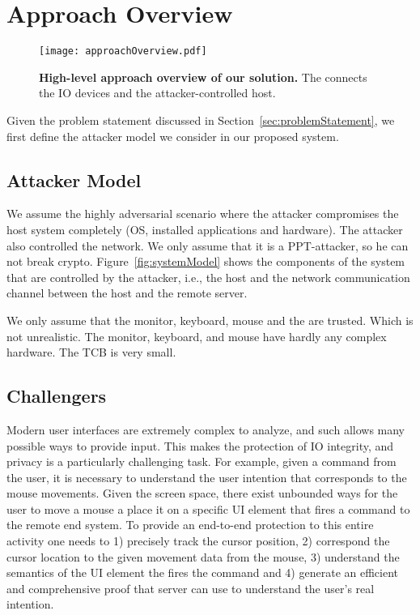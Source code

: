 \section{Approach Overview}
\label{sec:approach}





\begin{figure}[t]
\centering
\texttt{[image: approachOverview.pdf]}
\caption{\textbf{High-level approach overview of our solution.}  The \device connects the IO devices and the attacker-controlled host. }
\label{fig:approachOverview}
\centering
\end{figure}

Given the problem statement discussed in Section~\ref{sec:problemStatement}, we first define the attacker model we consider in our proposed system.


\subsection{Attacker Model}

We assume the highly adversarial scenario where the attacker compromises the host system completely (OS, installed applications and hardware). The attacker also controlled the network. We only assume that it is a PPT-attacker, so he can not break crypto. Figure~\ref{fig:systemModel} shows the components of the system that are controlled by the attacker, i.e., the host and the network communication channel between the host and the remote server.

We only assume that the monitor, keyboard, mouse and the \device are trusted. Which is not unrealistic. The monitor, keyboard, and mouse have hardly any complex hardware. The TCB is very small.

\subsection{Challengers}

Modern user interfaces are extremely complex to analyze, and such allows many possible ways to provide input. This makes the protection of IO integrity, and privacy is a particularly challenging task. For example, given a command from the user, it is necessary to understand the user intention that corresponds to the mouse movements. Given the screen space, there exist unbounded ways for the user to move a mouse a place it on a specific UI element that fires a command to the remote end system. To provide an end-to-end protection to this entire activity one needs to 1) precisely track the cursor position, 2) correspond the cursor location to the given movement data from the mouse, 3) understand the semantics of the UI element the fires the command and 4) generate an efficient and comprehensive proof that server can use to understand the user's real intention.  


